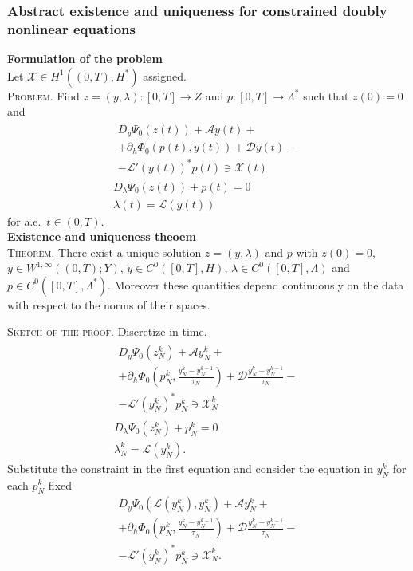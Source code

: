 \documentclass[8pt]{beamer}
\numberwithin{equation}{section}
\theoremstyle{definition}
\begin{document}
\begin{frame}
\frametitle{Abstract existence and uniqueness for constrained doubly nonlinear equations}
\centering
\begin{minipage}[c]{0.47\textwidth}
\textbf{Formulation of the problem}
\\[0.5ex]
Let $\mathscr{X}\in H^1((0,T),H^*)$ assigned.
\\[0.5em]
\textsc{Problem.} Find $z=(y,\lambda)\colon[0,T]\to Z$ and $p\colon[0,T]\to\Lambda^*$ such that $z(0)=0$ and
\begin{gather*}
\begin{multlined}
D_y\Psi_0(z(t))+\mathcal{A}y(t)+\\
+\partial_h\Phi_0(p(t),\dot y(t))+\mathcal{D}\dot y(t)-\\
-\mathscr{L}'(y(t))^*p(t)\ni\mathscr{X}(t)
\end{multlined} \\[0.5em]
D_\lambda\Psi_0(z(t))+p(t)=0 \\[0.5em]
\lambda(t)=\mathscr{L}(y(t))
\end{gather*}
for a.e.\ $t\in(0,T)$.
\\[1ex]
\textbf{Existence and uniqueness theoem}
\\[0.5ex]
\textsc{Theorem.} There exist a unique solution $z=(y,\lambda)$ and $p$ with $z(0)=0$, $y\in W^{1,\infty}((0,T);Y)$, $\dot y\in C^0([0,T],H)$, $\lambda\in C^0([0,T],\Lambda)$ and $p\in C^0([0,T],\Lambda^*)$. Moreover these quantities depend continuously on the data with respect to the norms of their spaces.
\end{minipage}
\hspace{0.02\textwidth}
\begin{minipage}[c]{0.47\textwidth}
\textsc{Sketch of the proof.} Discretize in time.
\begin{gather*}
\begin{multlined}
D_y\Psi_0(z_N^k)+\mathcal{A}y_N^k+\\
+\partial_h\Phi_0\left(p_N^k,\frac{y_N^k-y_N^{k-1}}{\tau_N}\right)+\mathcal{D}\frac{y_N^k-y_N^{k-1}}{\tau_N}-\\
-\mathscr{L}'(y_N^k)^*p_N^k\ni\mathscr{X}_N^k
\end{multlined} \\[0.5em]
D_\lambda\Psi_0(z_N^k)+p_N^k=0 \\[0.5em]
\lambda_N^k=\mathscr{L}(y_N^k).
\end{gather*}
Substitute the constraint in the first equation and consider the equation in $y_N^k$ for each $p_N^k$ fixed
\[
\begin{multlined}
D_y\Psi_0(\mathscr{L}(y_N^k),y_N^k)+\mathcal{A}y_N^k+\\
+\partial_h\Phi_0\left(p_N^k,\frac{y_N^k-y_N^{k-1}}{\tau_N}\right)+\mathcal{D}\frac{y_N^k-y_N^{k-1}}{\tau_N}-\\
-\mathscr{L}'(y_N^k)^*p_N^k\ni\mathscr{X}_N^k.
\end{multlined}
\]
\end{minipage}
\end{frame}
\end{document}
